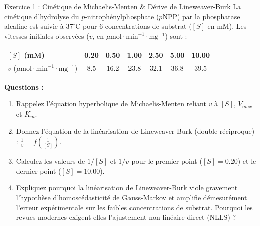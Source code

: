 \documentclass[11pt,a4paper]{article}
\begin{document}

\begin{exercicebox}{Exercice 1 : Cinétique de Michaelis-Menten \& Dérive de Lineweaver-Burk}
La cinétique d'hydrolyse du $p$-nitrophénylphosphate ($p\text{NPP}$) par la phosphatase alcaline est suivie à $37^\circ\text{C}$ pour 6 concentrations de substrat ($[S]$ en mM). Les vitesses initiales observées ($v$, en $\mu\text{mol}\cdot\text{min}^{-1}\cdot\text{mg}^{-1}$) sont :
\begin{center}
  \small
  \begin{tabular}{lcccccc}
    \toprule
    $[S]$ (mM) & 0.20 & 0.50 & 1.00 & 2.50 & 5.00 & 10.00 \\
    \midrule
    $v$ ($\mu\text{mol}\cdot\text{min}^{-1}\cdot\text{mg}^{-1}$) & 8.5 & 16.2 & 23.8 & 32.1 & 36.8 & 39.5 \\
    \bottomrule
  \end{tabular}
\end{center}

\textbf{Questions :}
\begin{enumerate}[label=\textbf{\alph*.}]
  \item Rappelez l'équation hyperbolique de Michaelis-Menten reliant $v$ à $[S]$, $V_{max}$ et $K_m$.
  \item Donnez l'équation de la linéarisation de Lineweaver-Burk (double réciproque) : $\frac{1}{v} = f\left(\frac{1}{[S]}\right)$.
  \item Calculez les valeurs de $1/[S]$ et $1/v$ pour le premier point ($[S] = 0.20$) et le dernier point ($[S] = 10.00$).
  \item Expliquez pourquoi la linéarisation de Lineweaver-Burk viole gravement l'hypothèse d'homoscédasticité de Gauss-Markov et amplifie démesurément l'erreur expérimentale sur les faibles concentrations de substrat. Pourquoi les revues modernes exigent-elles l'ajustement non linéaire direct (NLLS) ?
\end{enumerate}
\end{exercicebox}
\end{document}
